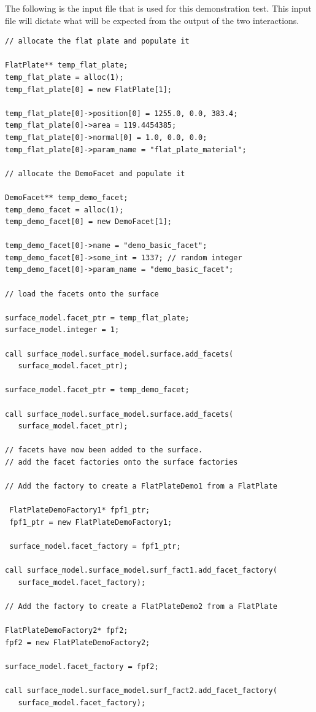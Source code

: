 \begin{description}
The following is the input file that is used for this demonstration
test. This input file will dictate what will be expected from the output
of the two interactions.

\begin{verbatim}
// allocate the flat plate and populate it

FlatPlate** temp_flat_plate;
temp_flat_plate = alloc(1);
temp_flat_plate[0] = new FlatPlate[1];

temp_flat_plate[0]->position[0] = 1255.0, 0.0, 383.4;
temp_flat_plate[0]->area = 119.4454385;
temp_flat_plate[0]->normal[0] = 1.0, 0.0, 0.0;
temp_flat_plate[0]->param_name = "flat_plate_material";

// allocate the DemoFacet and populate it

DemoFacet** temp_demo_facet;
temp_demo_facet = alloc(1);
temp_demo_facet[0] = new DemoFacet[1];

temp_demo_facet[0]->name = "demo_basic_facet";
temp_demo_facet[0]->some_int = 1337; // random integer
temp_demo_facet[0]->param_name = "demo_basic_facet";

// load the facets onto the surface

surface_model.facet_ptr = temp_flat_plate;
surface_model.integer = 1;

call surface_model.surface_model.surface.add_facets(
   surface_model.facet_ptr);

surface_model.facet_ptr = temp_demo_facet;

call surface_model.surface_model.surface.add_facets(
   surface_model.facet_ptr);

// facets have now been added to the surface.
// add the facet factories onto the surface factories

// Add the factory to create a FlatPlateDemo1 from a FlatPlate

 FlatPlateDemoFactory1* fpf1_ptr;
 fpf1_ptr = new FlatPlateDemoFactory1;
 
 surface_model.facet_factory = fpf1_ptr;
 
call surface_model.surface_model.surf_fact1.add_facet_factory(
   surface_model.facet_factory);

// Add the factory to create a FlatPlateDemo2 from a FlatPlate

FlatPlateDemoFactory2* fpf2;
fpf2 = new FlatPlateDemoFactory2;

surface_model.facet_factory = fpf2;

call surface_model.surface_model.surf_fact2.add_facet_factory(
   surface_model.facet_factory);


\end{verbatim}
\end{description}
